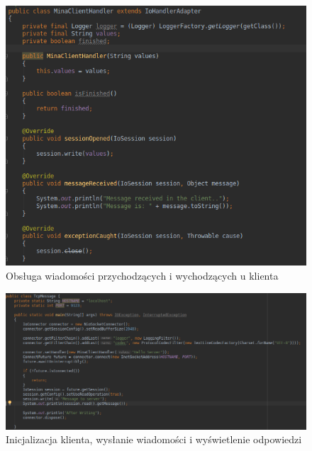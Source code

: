 \documentclass{article}
\begin{document}
	\begin{figure}[H]
		\centering
		\includegraphics[scale=0.6]{clientHandler.png}
		\caption[]{Obsługa wiadomości przychodzących i wychodzących u klienta}
		\label{fig:clientHandler}
	\end{figure}
	\begin{figure}[H]
		\centering
		\includegraphics[scale=0.5]{tcpMessage.png}
		\caption[]{Inicjalizacja klienta, wysłanie wiadomości i wyświetlenie odpowiedzi}
		\label{fig:tcpMessage}
	\end{figure}
\end{document}
